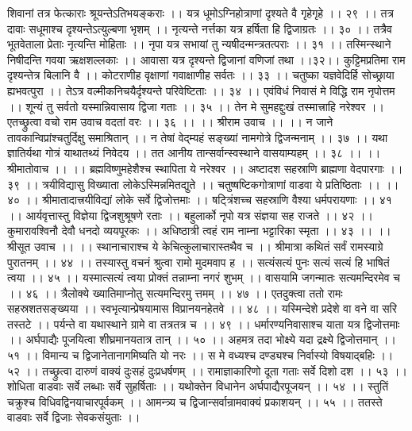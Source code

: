 शिवानां तत्र फेत्काराः श्रूयन्तेऽतिभयङ्कराः ।।
यत्र धूमोऽग्निहोत्राणां दृश्यते वै गृहेगृहे ।। २९ ।।
तत्र दावाः सधूमाश्च दृश्यन्तेऽत्युल्बणा भृशम् ।।
नृत्यन्ते नर्त्तका यत्र हर्षिता हि द्विजाग्रतः ।। ३० ।।
तत्रैव भूतवेताला प्रेताः नृत्यन्ति मोहिताः ।।
नृपा यत्र सभायां तु न्यषीदन्मन्त्रतत्पराः ।। ३१ ।।
तस्मिन्स्थाने निषीदन्ति गवया ऋक्षशल्लकाः ।।
आवासा यत्र दृश्यन्ते द्विजानां वणिजां तथा ।।३२।।
कुट्टिमप्रतिमा राम दृश्यन्तेत्र बिलानि वै ।।
कोटराणीह वृक्षाणां गवाक्षाणीह सर्वतः ।। ३३ ।।
चतुष्का यज्ञवेदिर्हि सोच्छ्राया ह्यभवत्पुरा ।।
तेऽत्र वल्मीकनिचयैर्दृश्यन्ते परिवेष्टिताः ।। ३४ ।।
एवंविधं निवासं मे विद्धि राम नृपोत्तम ।।
शून्यं तु सर्वतो यस्मान्निवासाय द्विजा गताः ।। ३५ ।।
तेन मे सुमहद्दुःखं तस्मात्त्राहि नरेश्वर ।।
एतच्छ्रुत्वा वचो राम उवाच वदतां वरः ।। ३६ ।।
।। श्रीराम उवाच ।। ।।
न जाने तावकान्विप्रांश्चतुर्दिक्षु समाश्रितान् ।।
न तेषां वेद्म्यहं सङ्ख्यां नामगोत्रे द्विजन्मनाम् ।। ३७ ।।
यथा ज्ञातिर्यथा गोत्रं याथातथ्यं निवेदय ।।
तत आनीय तान्सर्वान्स्वस्थाने वासयाम्यहम् ।। ३८ ।।
।। श्रीमातोवाच ।। ।।
ब्रह्मविष्णुमहेशैश्च स्थापिता ये नरेश्वर ।।
अष्टादश सहस्राणि ब्राह्मणा वेदपारगाः ।। ३९ ।।
त्रयीविद्यासु विख्याता लोकेऽस्मिन्नमितद्युते ।।
चतुष्षष्टिकगोत्राणां वाडवा ये प्रतिष्ठिताः ।। ।। ४० ।।
श्रीमातादात्त्रयीविद्यां लोके सर्वे द्विजोत्तमाः ।।
षट्त्रिंशच्च सहस्राणि वैश्या धर्मपरायणाः ।। ४१ ।।
आर्यवृत्तास्तु विज्ञेया द्विजशुश्रूषणे रताः ।।
बहुलार्को नृपो यत्र संज्ञया सह राजते ।। ४२ ।।
कुमारावश्विनौ देवौ धनदो व्ययपूरकः ।।
अधिष्ठात्री त्वहं राम नाम्ना भट्टारिका स्मृता ।। ४३ ।।
।। श्रीसूत उवाच ।। ।।
स्थानाचाराश्च ये केचित्कुलाचारास्तथैव च ।।
श्रीमात्रा कथितं सर्वं रामस्याग्रे पुरातनम् ।। ४४ ।।
तस्यास्तु वचनं श्रुत्वा रामो मुदमवाप ह ।।
सत्यंसत्यं पुनः सत्यं सत्यं हि भाषितं त्वया ।। ४५ ।।
यस्मात्सत्यं त्वया प्रोक्तं तन्नाम्ना नगरं शुभम् ।।
वासयामि जगन्मातः सत्यमन्दिरमेव च ।। ४६ ।।
त्रैलोक्ये ख्यातिमाप्नोतु सत्यमन्दिरमु त्तमम् ।। ४७ ।।
एतदुक्त्वा ततो रामः सहस्रशतसङ्ख्यया ।।
स्वभृत्यान्प्रेषयामास विप्रानयनहेतवे ।। ४८ ।।
यस्मिन्देशे प्रदेशे वा वने वा सरि तस्तटे ।।
पर्यन्ते वा यथास्थाने ग्रामे वा तत्रतत्र च ।। ४९ ।।
धर्मारण्यनिवासाश्च याता यत्र द्विजोत्तमाः ।।
अर्घपाद्यैः पूजयित्वा शीघ्रमानयतात्र तान् ।। ५० ।।
अहमत्र तदा भोक्ष्ये यदा द्रक्ष्ये द्विजोत्तमान् ।। ५१ ।।
विमान्य च द्विजानेतानागमिष्यति यो नरः ।।
स मे वध्यश्च दण्ड्यश्च निर्वास्यो विषयाद्बहिः ।। ५२ ।।
तच्छ्रुत्वा दारुणं वाक्यं दुःसहं दुःप्रधर्षणम् ।।
रामाज्ञाकारिणो दूता गताः सर्वे दिशो दश ।। ५३ ।।
शोधिता वाडवाः सर्वे लब्धाः सर्वे सुहर्षिताः ।।
यथोक्तेन विधानेन अर्घपाद्यैरपूजयन् ।। ५४ ।।
स्तुतिं चक्रुश्च विधिवद्विनयाचारपूर्वकम् ।।
आमन्त्र्य च द्विजान्सर्वान्रामवाक्यं प्रकाशयन् ।। ५५ ।।
ततस्ते वाडवाः सर्वे द्विजाः सेवकसंयुताः ।।
